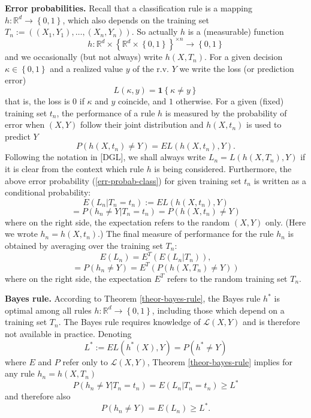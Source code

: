 \documentclass[11pt,twoside]{article}%
\theoremstyle{change}
\begin{document}
\textbf{Error probabilities.} Recall that a classification rule is a mapping
$h:\mathbb{R}^{d}\rightarrow\left\{  0,1\right\}  $, which also depends on the
training set $T_{n}:=\left(  (X_{1},Y_{1}),\ldots,(X_{n},Y_{n})\right)  $. So
actually $h$ is a (measurable) function%
\[
h:\mathbb{R}^{d}\times\left\{  \mathbb{R}^{d}\times\left\{  0,1\right\}
\right\}  ^{\times n}\rightarrow\left\{  0,1\right\}
\]
and we occasionally (but not always) write $h(X,T_{n})$. For a given decision
$\kappa\in\left\{  0,1\right\}  $ and a realized value $y$ of the r.v. $Y$ we
write the loss (or prediction error)
\[
L\left(  \kappa,y\right)  =\mathbf{1}\left\{  \kappa\neq y\right\}
\]
that is, the loss is $0$ if $\kappa$ and $y$ coincide, and $1$ otherwise. For
a given (fixed) training set $t_{n}$, the performance of a rule $h$ is
measured by the probability of error when $(X,Y)$ follow their joint
distribution and $h(X,t_{n})$ is used to predict $Y$
\begin{equation}
P\left(  h(X,t_{n})\neq Y\right)  =EL\left(  h(X,t_{n}),Y\right)
.\label{err-probab-class}%
\end{equation}
Following the notation in [DGL], we shall always write $L_{n}=L\left(
h(X,T_{n}),Y\right)  $ if it is clear from the context which rule $h$ is being
considered. Furthermore, the above error probability (\ref{err-probab-class})
for given training set $t_{n}$ is written as a conditional probability:%
\[
E\left(  L_{n}|T_{n}=t_{n}\right)  :=EL\left(  h(X,t_{n}),Y\right)
\]%
\[
=P\left(  h_{n}\neq Y|T_{n}=t_{n}\right)  =P\left(  h(X,t_{n})\neq Y\right)
\]
where on the right side, the expectation refers to the random $(X,Y)$ only.
(Here we wrote $h_{n}=h(X,t_{n}).$) The final measure of performance for the
rule $h_{n}$ is obtained by averaging over the training set $T_{n}$:%
\begin{equation}
E\left(  L_{n}\right)  =E^{T}\left(  E\left(  L_{n}|T_{n}\right)  \right)
,\label{err-probab-class-total}%
\end{equation}%
\[
=P\left(  h_{n}\neq Y\right)  =E^{T}\left(  P\left(  h(X,T_{n})\neq Y\right)
\right)
\]
where on the right side, the expectation $E^{T}$ refers to the random training
set $T_{n}$.\bigskip

\textbf{Bayes rule. }According to Theorem \ref{theor-bayes-rule}, the Bayes
rule $h^{\ast}$ is optimal among all rules $h:\mathbb{R}^{d}\rightarrow
\left\{  0,1\right\}  $, including those which depend on a training set
$T_{n}$. The Bayes rule requires knowledge of $\mathcal{L}(X,Y)$ and is
therefore not available in practice. Denoting
\[
L^{\ast}:=EL\left(  h^{\ast}(X),Y\right)  =P\left(  h^{\ast}\neq Y\right)
\]
where $E$ and $P$ refer only to $\mathcal{L}(X,Y)$, Theorem
\ref{theor-bayes-rule} implies for any rule $h_{n}=h(X,T_{n})$
\begin{equation}
P\left(  h_{n}\neq Y|T_{n}=t_{n}\right)  =E\left(  L_{n}|T_{n}=t_{n}\right)
\geq L^{\ast}\label{lower-bound-loss-Bayes}%
\end{equation}
and therefore also
\[
P\left(  h_{n}\neq Y\right)  =E\left(  L_{n}\right)  \geq L^{\ast}.
\]
\end{document}
